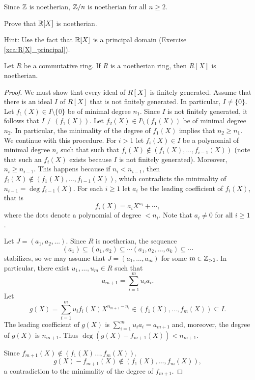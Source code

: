 Since $\mathbb{Z}$ is noetherian, $\mathbb{Z}/n$ is noetherian for all $n\geq2$. 

\begin{exercise}
\label{xca:R[X]_noetherian}
	Prove that $\mathbb{R}[X]$ is noetherian. 	
\end{exercise}

Hint: Use the fact that $\mathbb{R}[X]$ is a principal domain (Exercise \ref{xca:R[X]_principal}).  

\begin{theorem}[Hilbert]
	Let $R$ be a commutative ring. If $R$ is a noetherian ring, then $R[X]$ is noetherian.	
\end{theorem}

\begin{proof}
	We must show that every ideal of $R[X]$ is finitely generated. Assume that
	there is an ideal $I$ of $R[X]$ that is not finitely generated. In particular, $I\ne\{0\}$. 
	Let $f_1(X)\in I\setminus\{0\}$ be of minimal degree $n_1$. 
	Since $I$ is not finitely generated, it follows that 
	$I\ne (f_1(X))$. Let $f_2(X)\in I\setminus (f_1(X))$ be
	of minimal degree $n_2$. In particular, the minimality of the degree of $f_1(X)$ implies that 
	$n_2\geq n_1$. 
	We continue with this procedure. For $i>1$ let 
	$f_i(X)\in I$ be a polynomial of minimal degree $n_i$ such that  
	such that $f_i(X)\not\in(f_1(X),\dots,f_{i-1}(X))$ (note
	that such an $f_i(X)$ exists because $I$ is not finitely generated). 
	Moreover, $n_i\geq n_{i-1}$. This happens because 
	if $n_i<n_{i-1}$, then
	$f_i(X)\not\in (f_1(X),\dots,f_{i-1}(X))$, which contradicts
	the minimality of $n_{i-1}=\deg f_{i-1}(X)$. 
	For each $i\geq1$ 
	let $a_i$ be the leading coefficient of $f_i(X)$, that is
	\[
	f_i(X)=a_iX^{n_i}+\cdots,
	\]
	where the dots denote a polynomial of 
	degree $<n_i$. Note that 
	$a_i\ne 0$ for all $i\geq 1$. 
	
	Let $J=(a_1,a_2,\dots)$. Since $R$ is noetherian, the sequence
	\[
	(a_1)\subseteq (a_1,a_2)\subseteq\cdots(a_1,a_2,\dots,a_k)\subseteq\cdots
	\]
	stabilizes, so we may assume that 
	$J=(a_1,\dots,a_m)$ for some $m\in\mathbb{Z}_{>0}$. 
	In particular, there exist $u_1,\dots,u_m\in R$ such that 
	\[
	a_{m+1}=\sum_{i=1}^m u_ia_i.
	\]
	Let 
	\[
	g(X)=\sum_{i=1}^mu_if_i(X)X^{n_{m+1}-n_i}\in (f_1(X),\dots,f_m(X))\subseteq I.
	\]
	The leading coefficient of $g(X)$ is $\sum_{i=1}^mu_ia_i=a_{m+1}$ and, moreover, 
	the degree of $g(X)$ is $n_{m+1}$. Thus $\deg(g(X)-f_{m+1}(X))<n_{m+1}$. 
	
	Since $f_{m+1}(X)\not\in (f_1(X)\dots,f_m(X))$, 
	\[
	g(X)-f_{m+1}(X)\not\in (f_1(X),\dots,f_m(X)),
	\]
	a contradiction to the minimality of the degree of $f_{m+1}$.  
\end{proof}

